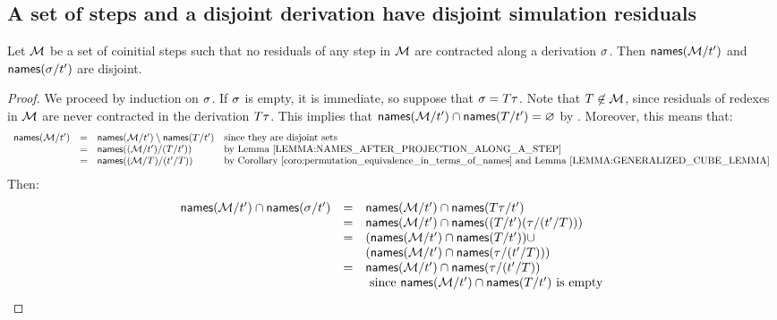 \subsection*{A set of steps and a disjoint derivation have disjoint simulation residuals}
\begin{lemma}
Let $\mathcal{M}$ be a set of coinitial steps such that no residuals of any step in $\mathcal{M}$
are contracted along a derivation $\sigma$.
Then $\mathsf{names}(\mathcal{M}/t')$ and $\mathsf{names}(\sigma/t')$ are disjoint.
\end{lemma}
\begin{proof}
We proceed by induction on $\sigma$. If $\sigma$ is empty, it is immediate,
so suppose that $\sigma = T\tau$.
Note that $T \not\in \mathcal{M}$,
since residuals of redexes in $\mathcal{M}$ are never contracted in the derivation $T\tau$.
This implies that $\mathsf{names}(\mathcal{M}/t') \cap \mathsf{names}(T/t') = \varnothing$
by .
Moreover, this means that:
\[
  \begin{array}{rcll}
  \names(\redexset/\tm')
  & = & \names(\redexset/\tm') \setminus \names(\redexthree/\tm') & \text{since they are disjoint sets} \\
  & = & \names((\redexset/\tm')/(\redexthree/\tm')) & \text{by \rlem{names_after_projection_along_a_step}} \\
  & = & \names((\redexset/\redexthree)/(\tm'/\redexthree)) & \text{by \rcoro{permutation_equivalence_in_terms_of_names} and \rlem{generalized_cube_lemma}} \\
  \end{array}
\]
Then:
\[
  \begin{array}{rcll}
  \mathsf{names}(\mathcal{M}/t') \cap \mathsf{names}(\sigma/t')
  & = & \mathsf{names}(\mathcal{M}/t') \cap \mathsf{names}(T\tau/t') \\
  & = & \mathsf{names}(\mathcal{M}/t') \cap \mathsf{names}((T/t')(\tau/(t'/T))) \\
  & = & (\mathsf{names}(\mathcal{M}/t') \cap \mathsf{names}(T/t')) \cup \\
    && (\mathsf{names}(\mathcal{M}/t') \cap \mathsf{names}(\tau/(t'/T))) \\
  & = & \mathsf{names}(\mathcal{M}/t') \cap \mathsf{names}(\tau/(t'/T)) \\
  && \text{ since $\mathsf{names}(\mathcal{M}/t') \cap \mathsf{names}(T/t')$ is empty} \\

\end{array}\]
\end{proof}
